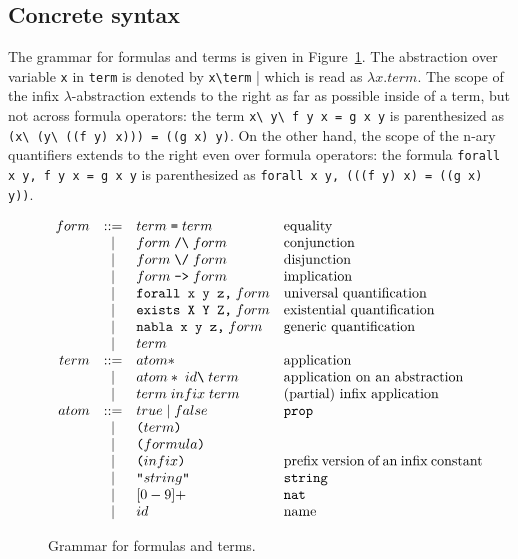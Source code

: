 \documentclass{article}
\begin{document}
\subsection{Concrete syntax}

The grammar for formulas and terms is given in Figure~\ref{concrete}.
The abstraction over variable \verb.x. in \verb.term. is denoted by
\verb.x\term. | which is read as $\lambda x. term$. The scope of the
infix $\lambda$-abstraction extends to the right as far as possible
inside of a term, but not across formula operators: the term
\verb.x\ y\ f y x = g x y. is parenthesized as
\verb.(x\ (y\ ((f y) x))) = ((g x) y)..
On the other hand, the scope of the n-ary quantifiers extends to the
right even over formula operators: the formula
{\tt forall x y, f y x = g x y} is parenthesized as
{\tt forall x y, (((f y) x) = ((g x) y))}.

\begin{figure}
\[\begin{array}{rclp{5cm}}
form &::=& term\;\verb.=.\;term         & equality \\
     & | & form\;\verb./\.\;form        & conjunction \\
     & | & form\;\verb.\/.\;form        & disjunction \\
     & | & form\;\verb.->.\;form        & implication \\
     & | & \verb.forall x y z,.\;form   & universal quantification \\
     & | & \verb.exists X Y Z,.\;form   & existential quantification \\
     & | & \verb.nabla x y z,.\;form    & generic quantification \\
     & | & term                         & \\
term &::=& atom*                        & application \\
     & | & atom*\;id\verb.\.\;term      & application on an
                                          abstraction \\
     & | & term\;infix\;term            & (partial) infix application \\
atom &::=& true\;|\;false               & {\tt prop} \\
     & | & \verb.(.term\verb.).         & \\
     & | & \verb.(.formula\verb.).      & \\
     & | & \verb.(.infix\verb.).        & prefix version of an infix
                                          constant\\
     & | & \verb.".string\verb.".       & {\tt string} \\
     & | & [0-9]+                       & {\tt nat} \\
     & | & id                           & name \\
\end{array}\]
\caption{Grammar for formulas and terms.}
\label{concrete}
\end{figure}
\end{document}
